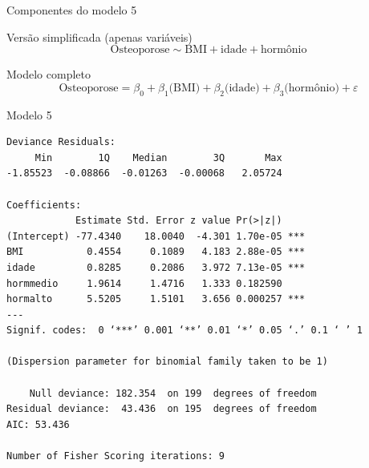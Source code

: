 \documentclass{beamer}
\begin{document}
\begin{frame}{\small Componentes do modelo 5}
  \begin{block}{\footnotesize Versão simplificada (apenas variáveis)}
    \footnotesize
    \begin{displaymath}
      \text{Osteoporose} \sim \text{BMI} + \text{idade} + \text{hormônio}
    \end{displaymath}
  \end{block}
  \bigskip
  \bigskip
  \begin{block}{Modelo completo}
    \begin{displaymath}
      \text{Osteoporose} =\beta_0 + \beta_1 \text{(BMI)} + \beta_2 \text{(idade)} + \beta_3 \text{(hormônio)} +\varepsilon
    \end{displaymath}
  \end{block}
  \vfill
\end{frame}

\begin{frame}[fragile]{}
  \begin{center}
    \begin{exampleblock}{Modelo 5}
      \tiny
\begin{verbatim}
Deviance Residuals: 
     Min        1Q    Median        3Q       Max  
-1.85523  -0.08866  -0.01263  -0.00068   2.05724  

Coefficients:
            Estimate Std. Error z value Pr(>|z|)    
(Intercept) -77.4340    18.0040  -4.301 1.70e-05 ***
BMI           0.4554     0.1089   4.183 2.88e-05 ***
idade         0.8285     0.2086   3.972 7.13e-05 ***
hormmedio     1.9614     1.4716   1.333 0.182590    
hormalto      5.5205     1.5101   3.656 0.000257 ***
---
Signif. codes:  0 ‘***’ 0.001 ‘**’ 0.01 ‘*’ 0.05 ‘.’ 0.1 ‘ ’ 1

(Dispersion parameter for binomial family taken to be 1)

    Null deviance: 182.354  on 199  degrees of freedom
Residual deviance:  43.436  on 195  degrees of freedom
AIC: 53.436

Number of Fisher Scoring iterations: 9
\end{verbatim}
    \end{exampleblock}
  \end{center}
\end{frame}
\end{document}
